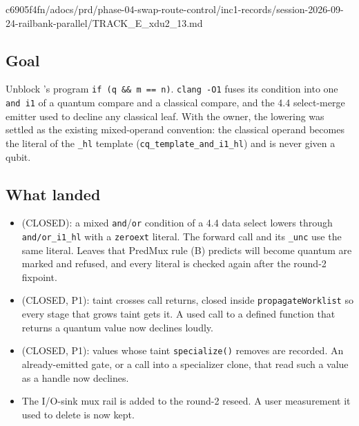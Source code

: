%
  {c6905f4f}{n/a}{docs/prd/phase-04-swap-route-control/inc1-records/session-2026-09-24-railbank-parallel/TRACK\_E\_xdu2\_13.md}

\subsection*{Goal}
Unblock 's program \texttt{if (q \&\& m == n)}.
\texttt{clang -O1} fuses its condition into one \texttt{and i1} of a quantum
compare and a classical compare, and the 4.4 select-merge emitter used to
decline any classical leaf. With the owner, the lowering was settled as the
existing mixed-operand convention: the classical operand becomes the literal
of the \texttt{\_hl} template (\texttt{cq\_template\_and\_i1\_hl}) and is never
given a qubit.

\subsection*{What landed}
\begin{itemize}
  \item {} (CLOSED): a mixed \texttt{and}/\texttt{or} condition of a
    4.4 data select lowers through \texttt{and/or\_i1\_hl} with a
    \texttt{zeroext} literal. The forward call and its \texttt{\_unc} use the
    same literal. Leaves that PredMux rule (B) predicts will become quantum are
    marked and refused, and every literal is checked again after the round-2
    fixpoint.
  \item {} (CLOSED, P1): taint crosses call returns, closed inside
    \texttt{propagateWorklist} so every stage that grows taint gets it. A used
    call to a defined function that returns a quantum value now declines
    loudly.
  \item {} (CLOSED, P1): values whose taint \texttt{specialize()}
    removes are recorded. An already-emitted gate, or a call into a
    specializer clone, that read such a value as a handle now declines.
  \item The I/O-sink mux rail is added to the round-2 reseed. A user
    measurement it used to delete is now kept.
\end{itemize}

